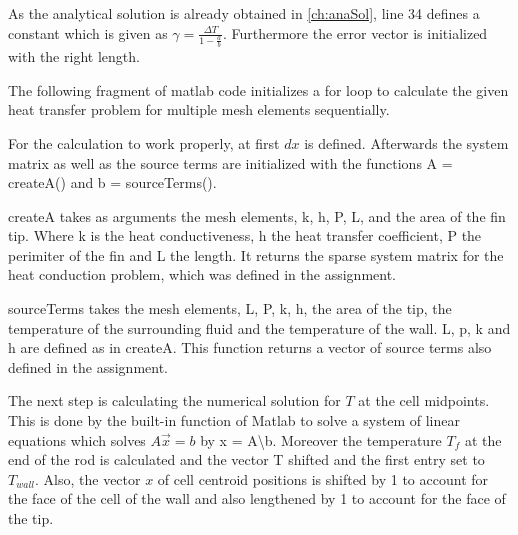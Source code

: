 As the analytical solution is already obtained in \autoref{ch:anaSol}, line 34 defines a constant which is given as $\gamma = \frac{\Delta T}{1-\frac{a}{b}}$. Furthermore the error vector is initialized with the right length. 





The following fragment of matlab code initializes a for loop to calculate the given heat transfer problem for multiple mesh elements sequentially.



For the calculation to work properly, at first $dx$ is defined. Afterwards the system matrix as well as the source terms are initialized with the functions A = createA() and b = sourceTerms().


createA takes as arguments the mesh elements, k, h, P, L, and the area of the fin tip. Where k is the heat conductiveness, h the heat transfer coefficient, P the perimiter of the fin and L the length. It returns the sparse system matrix for the heat conduction problem, which was defined in the assignment.

sourceTerms takes the mesh elements, L, P, k, h, the area of the tip, the temperature of the surrounding fluid and the temperature of the wall. L, p, k and h are defined as in createA. This function returns a vector of source terms also defined in the assignment.


The next step is calculating the numerical solution for $T$ at the cell midpoints. This is done by the built-in function of Matlab to solve a system of linear equations which solves $A\vec{x} = b$ by x = A\textbackslash b. Moreover the temperature $T_f$ at the end of the rod is calculated and the vector T shifted and the first entry set to $T_{wall}$. Also, the vector $x$ of cell centroid positions is shifted by 1 to account for the face of the cell of the wall and also lengthened by 1 to account for the face of the tip.


